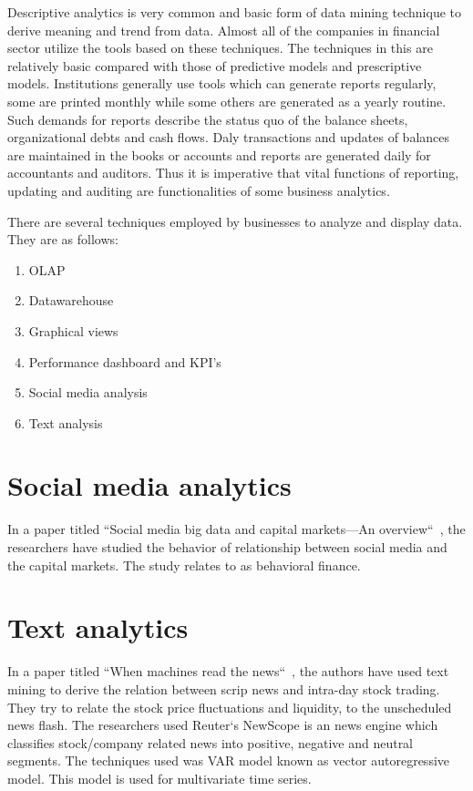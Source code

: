 Descriptive analytics is very common and basic form of data mining technique to derive meaning and trend from data. Almost all of the companies in financial sector utilize the tools based on these techniques. The techniques in this are relatively basic compared with those of predictive models and prescriptive models. Institutions generally use tools which can generate reports regularly, some are printed monthly while some others are generated  as a yearly routine. Such demands for reports describe the status quo of the balance sheets, organizational debts and cash flows. Daly transactions and updates of balances are maintained in the books or accounts and reports are generated daily for accountants and auditors. Thus it is imperative that vital functions of reporting, updating and auditing are functionalities of some business analytics.

There are several techniques employed by businesses to analyze and display data. They are as follows:
\begin{enumerate}
	\item OLAP
	\item Datawarehouse
	\item Graphical views
	\item Performance dashboard and KPI's
	\item Social media analysis
	\item Text analysis
\end{enumerate}

\section{Social media analytics}
In a paper titled ``Social media big data and capital markets—An overview``~, the researchers have studied the behavior of relationship between social media and the capital markets. The study relates to as behavioral finance. 

\section{Text analytics}
In a paper titled ``When machines read the news``~, the authors have used text mining to derive the relation between scrip news and intra-day stock trading. They try to relate the stock price fluctuations and liquidity, to the unscheduled news flash. The researchers used Reuter`s NewScope is an news engine which classifies stock/company related news into positive, negative and neutral segments. The techniques used was VAR model known as vector autoregressive model. This model is used for multivariate time series. 

